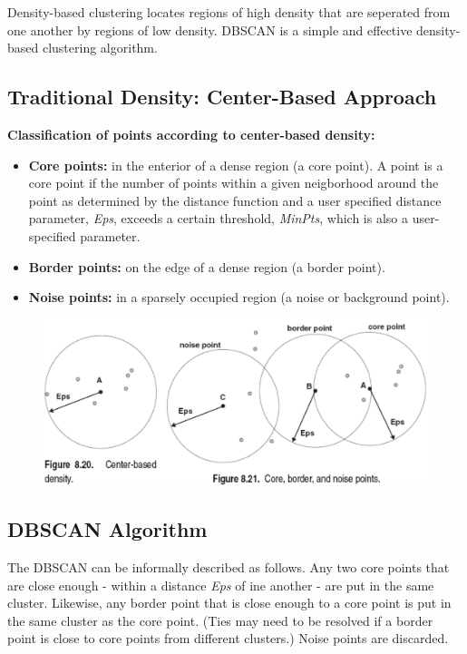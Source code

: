 		Density-based clustering locates regions of high density that are seperated
		from one another by regions of low density. DBSCAN is a simple and effective
		density-based clustering algorithm. 

		\subsection{Traditional Density: Center-Based Approach}

		{\bf Classification of points according to center-based density:}
		\begin{itemize}
			\item {\bf Core points:} in the enterior of a dense region (a core point).
			A point is a core point if the number of points within a given neigborhood around the 
			point as determined by the distance function and a user specified distance 
			parameter, {\it Eps}, exceeds a certain threshold, {\it MinPts}, which is also a
			user-specified parameter.  
			\item {\bf Border points:} on the edge of a dense region (a border point).
			\item {\bf Noise points:} in a sparsely occupied region (a noise or background point).
		\end{itemize}


			\begin{figure}[H]
				\centering
				\includegraphics[width=\textwidth]{pics/dbscan.png}
			\end{figure}

		\subsection{DBSCAN Algorithm}

			The DBSCAN can be informally described as follows. Any two core points
			that are close enough - within a distance {\it Eps} of ine another - 
			are put in the same cluster. Likewise, any border point that is close 
			enough to a core point is put in the same cluster as the core point.
			(Ties may need to be resolved if a border point is close to core points
			from different clusters.) Noise points are discarded. 

